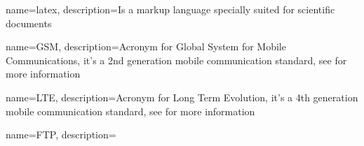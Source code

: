{
    name=latex,
    description={Is a markup language specially suited
    for scientific documents}
}

{
    name=GSM,
    description={Acronym for Global System for Mobile Communications, it's a 2nd generation mobile communication
    standard, see \cite{Principles of GSM} for more information}
}

{
    name=LTE,
    description={Acronym for Long Term Evolution, it's a 4th generation mobile communication standard, see \cite{} for more information}
}

{
    name=FTP,
    description={}
}

\makeglossaries
